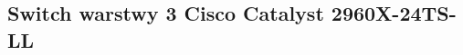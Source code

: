 \documentclass[a4paper,12pt]{extarticle}  %
\begin{document}
\subsection{Switch warstwy 3 Cisco Catalyst 2960X-24TS-LL}
\begin{figure}[H]
   \centering
\end{figure}
\end{document}

